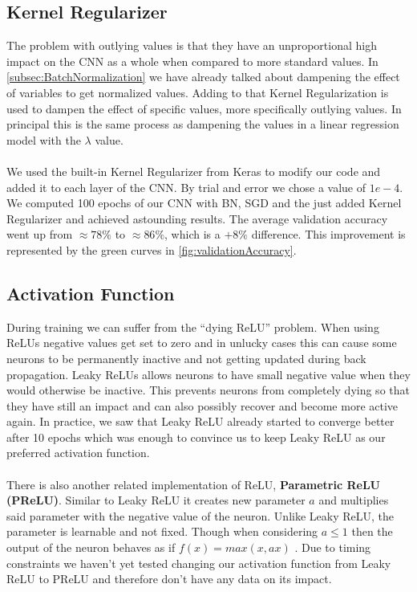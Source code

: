 \documentclass{article}
\begin{document}
	\subsection{Kernel Regularizer}
	\label{subsec:KernelRegularizer}
	The problem with outlying values is that they have an unproportional high impact on the CNN as a whole when compared to more standard values. In \autoref{subsec:BatchNormalization} we have already talked about dampening the effect of variables to get normalized values. Adding to that Kernel Regularization is used to dampen the effect of specific values, more specifically outlying values. In principal this is the same process as dampening the values in a linear regression model with the $\lambda$ value. \\
	\\
	We used the built-in Kernel Regularizer from Keras to modify our code and added it to each layer of the CNN. By trial and error we chose a value of $1e-4$. We computed 100 epochs of our CNN with BN, SGD and the just added Kernel Regularizer and achieved astounding results. The average validation accuracy went up from $\approx78\%$ to $\approx86\%$, which is a $+8\%$ difference. This improvement is represented by the green curves in \autoref{fig:validationAccuracy}. 
	
	
	
	\subsection{Activation Function}
	During training we can suffer from the \enquote{dying ReLU} problem. When using ReLUs negative values get set to zero and in unlucky cases this can cause some neurons to be permanently inactive and not getting updated during back propagation. Leaky ReLUs allows neurons to have small negative value when they would otherwise be inactive. This prevents neurons from completely dying so that they have still an impact and can also possibly recover and become more active again. In practice, we saw	that Leaky ReLU already started to converge better after 10 epochs which was enough to convince us to keep Leaky ReLU as our preferred activation function.\\
	\\
	There is also another related implementation of ReLU, \textbf{Parametric ReLU (PReLU)}. Similar to Leaky ReLU it creates new parameter $a$ and multiplies said parameter with the negative value of the neuron. Unlike Leaky ReLU, the parameter is learnable and not fixed. Though when considering $a \le 1$ then the output of the neuron behaves as if $f(x) = max (x, ax)$ \cite{DBLP:journals/corr/HeZR015}. Due to timing constraints we haven't yet tested changing our activation function from Leaky ReLU to PReLU and therefore don't have any data on its impact.
	
\end{document}
